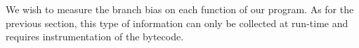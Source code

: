 We wish to measure the branch bias on each function of our program. As for the previous section, this type of information can only be collected at run-time and requires instrumentation of the bytecode.
